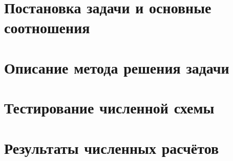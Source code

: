 \section{Постановка задачи и основные соотношения}

\section{Описание метода решения задачи}

\section{Тестирование численной схемы}

\section{Результаты численных расчётов}



